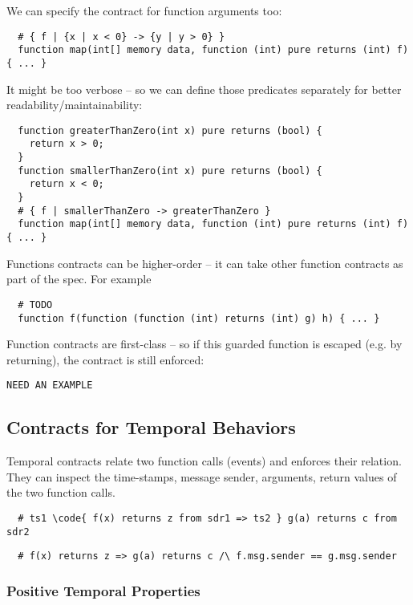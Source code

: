 We can specify the contract for function arguments too:
\begin{lstlisting}
  # { f | {x | x < 0} -> {y | y > 0} }
  function map(int[] memory data, function (int) pure returns (int) f) { ... }
\end{lstlisting}
It might be too verbose -- so we can define those predicates separately for better readability/maintainability:
\begin{lstlisting}
  function greaterThanZero(int x) pure returns (bool) {
    return x > 0;
  }
  function smallerThanZero(int x) pure returns (bool) {
    return x < 0;
  }
  # { f | smallerThanZero -> greaterThanZero }
  function map(int[] memory data, function (int) pure returns (int) f) { ... }
\end{lstlisting}

Functions contracts can be higher-order --
it can take other function contracts
as part of the spec. For example
\begin{lstlisting}
  # TODO
  function f(function (function (int) returns (int) g) h) { ... }
\end{lstlisting}

Function contracts are first-class -- so if this guarded function is escaped
(e.g. by returning), the contract is still enforced:
\begin{lstlisting}
NEED AN EXAMPLE
\end{lstlisting}
\fi

\subsection{Contracts for Temporal Behaviors}

Temporal contracts relate two function calls (events) and enforces their
relation.
They can inspect the time-stamps, message sender, arguments, return values
of the two function calls.

\begin{lstlisting}
  # ts1 \code{ f(x) returns z from sdr1 => ts2 } g(a) returns c from sdr2
\end{lstlisting}
\begin{lstlisting}
  # f(x) returns z => g(a) returns c /\ f.msg.sender == g.msg.sender
\end{lstlisting}

\subsubsection{Positive Temporal Properties}


